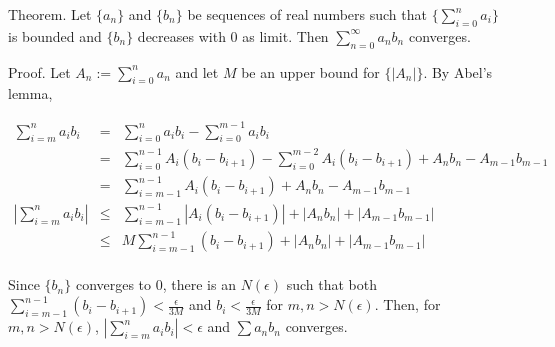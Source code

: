 \documentclass[12pt]{article}
\begin{document}
Theorem. Let $\{a_n\}$ and $\{b_n\}$ be sequences of real numbers such that $\{\sum_{i=0}^n a_i\}$ is bounded and $\{b_n\}$ decreases with $0$ as limit.
Then $\sum_{n=0}^\infty a_nb_n$ converges.

Proof. Let $A_n:=\sum_{i=0}^n a_n$ and let $M$ be an upper bound for $\{|A_n|\}$. By Abel's lemma, 

\begin{eqnarray*}
\sum_{i=m}^n a_ib_i &=& \sum_{i=0}^n a_ib_i - \sum_{i=0}^{m-1} a_ib_i\\
                    &=& \sum_{i=0}^{n-1} A_i(b_i-b_{i+1}) - \sum_{i=0}^{m-2} A_i(b_i-b_{i+1}) +A_nb_n - A_{m-1}b_{m-1}\\
&=&\sum_{i=m-1}^{n-1}A_i(b_i-b_{i+1}) +A_nb_n -A_{m-1}b_{m-1}\\
|\sum_{i=m}^{n} a_ib_i|&\leq& \sum_{i=m-1}^{n-1}|A_i(b_i-b_{i+1})| + |A_nb_n| + |A_{m-1}b_{m-1}|\\ 
&\leq& M \sum_{i=m-1}^{n-1}(b_i-b_{i+1}) + |A_nb_n| + |A_{m-1}b_{m-1}|\\
\end{eqnarray*}

Since $\{b_n\}$ converges to $0$, there is an $N(\epsilon)$ such that both $\sum_{i=m-1}^{n-1}(b_i-b_{i+1})<\frac{\epsilon}{3M}$ and $b_i<\frac{\epsilon}{3M}$ for $m,n>N(\epsilon)$. Then, for $m,n>N(\epsilon)$, $|\sum_{i=m}^n a_ib_i|<\epsilon$ and $\sum a_nb_n$ converges.
\end{document}
